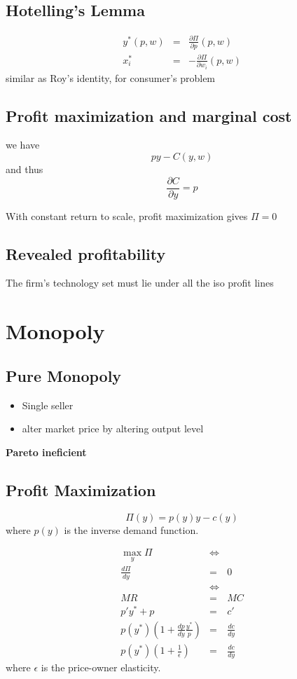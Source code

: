 \documentclass[a4paper] {scrartcl}
\begin{document}
\subsection{Hotelling's Lemma}
\begin{eqnarray}
	y^*(p,w) &=&\frac{\partial \Pi}{\partial p}(p,w)\\
	x_i^* &=& -\frac{\partial\Pi}{\partial w_i}(p,w)
\end{eqnarray}
similar as Roy's identity, for consumer's problem

\subsection{Profit maximization and marginal cost}
we have
\begin{equation}
	py - C(y,w)
\end{equation}
and thus
\begin{equation}
	\frac{\partial C}{\partial y}=p
\end{equation}

With constant return to scale, profit maximization gives $\Pi=0$

\subsection{Revealed profitability}
The firm's technology set must lie under all the iso profit lines

\section{Monopoly}
\subsection{Pure Monopoly}
\begin{itemize}
	\item Single seller
	\item alter market price by altering output level
\end{itemize}
\textbf{Pareto ineficient}

\subsection{Profit Maximization}
\begin{equation}
	\Pi(y) = p(y)y - c(y)
\end{equation}
where $p(y)$ is the inverse demand function.

\begin{eqnarray}
	\max_y \Pi &\Leftrightarrow&\\
	\frac{d \Pi}{d y} &=& 0\\
	&\Leftrightarrow&\\
	MR &=& MC\\
	p'y^*+p &=& c'\\
	 p(y^*)(1+\frac{dp}{dy}\frac{y^*}{p}) &=&\frac{dc}{dy}\\
	 p(y^*)(1+\frac{1}{\epsilon}) &=&\frac{dc}{dy}
\end{eqnarray}
where $\epsilon$ is the price-owner elasticity.
\end{document}
